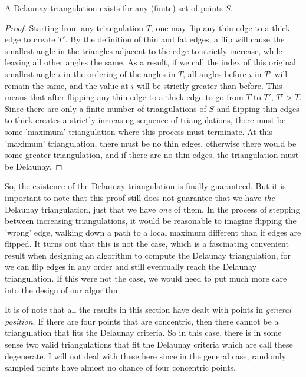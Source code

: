 \begin{theorem}
	A Delaunay triangulation exists for any (finite) set of points $S$.
\end{theorem}
\begin{proof}
	Starting from any triangulation $T$, one may flip any thin edge to a thick edge to create $T'$.
	By the definition of thin and fat edges, a flip will cause the smallest angle in the triangles adjacent to the edge to strictly increase, while leaving all other angles the same.
	As a result, if we call the index of this original smallest angle $i$ in the ordering of the angles in $T$, all angles before $i$ in $T'$ will remain the same, and the value at $i$ will be strictly greater than before.
	This means that after flipping any thin edge to a thick edge to go from $T$ to $T'$, $T' > T$.
	Since there are only a finite number of triangulations of $S$ and flipping thin edges to thick creates a strictly increasing sequence of triangulations, there must be some 'maximum' triangulation where this process must terminate.
	At this 'maximum' triangulation, there must be no thin edges, otherwise there would be some greater triangulation, and if there are no thin edges, the triangulation must be Delaunay.
\end{proof}

So, the existence of the Delaunay triangulation is finally guaranteed.
But it is important to note that this proof still does not guarantee that we have \textit{the} Delaunay triangulation, just that we have \textit{one} of them.
In the process of stepping between increasing triangulations, it would be reasonable to imagine flipping the 'wrong' edge, walking down a path to a local maximum different than if edges are flipped.
It turns out that this is not the case, which is a fascinating convenient result when designing an algorithm to compute the Delaunay triangulation, for we can flip edges in any order and still eventually reach the Delaunay triangulation.
If this were not the case, we would need to put much more care into the design of our algorithm.


It is of note that all the results in this section have dealt with points in \textit{general position}.
If there are four points that are concentric, then there cannot be a triangulation that fits the Delaunay criteria.
So in this case, there is in some sense two valid triangulations that fit the Delaunay criteria which are call these degenerate.
I will not deal with these here since in the general case, randomly sampled points have almost no chance of four concentric points.

